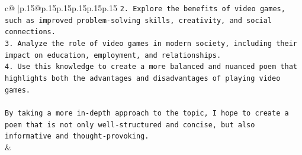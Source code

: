 \documentclass{article}
\begin{document}
{\begin{supertabular}{c@{$\;$}|p{.15\linewidth}@{}p{.15\linewidth}p{.15\linewidth}p{.15\linewidth}p{.15\linewidth}p{.15\linewidth}}
{{{\texttt{2. Explore the benefits of video games, such as improved problem{-}solving skills, creativity, and social connections.} \\
\texttt{3. Analyze the role of video games in modern society, including their impact on education, employment, and relationships.} \\
\texttt{4. Use this knowledge to create a more balanced and nuanced poem that highlights both the advantages and disadvantages of playing video games.} \\
\\ 
\texttt{By taking a more in{-}depth approach to the topic, I hope to create a poem that is not only well{-}structured and concise, but also informative and thought{-}provoking.} \\
            }
        }
    }
    & \\ \\

\end{supertabular}
}
\end{document}
